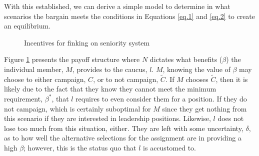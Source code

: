 \documentclass [12pt]{article}
\begin{document}
With this established, we can derive a simple model to determine in what scenarios the bargain meets the conditions in Equations \ref{eq.1} and \ref{eq.2} to create an equilibrium.

\begin{figure}
\begin{center}


\caption{Incentives for finking on seniority system}	 
\label{Fig1}
\end{center}
\end{figure}

Figure \ref{Fig1} presents the payoff structure where $N$ dictates what benefits ($\beta$) the individual member, $M$, provides to the caucus, $l$. $M$, knowing the value of $\beta$ may choose to either campaign, $C$, or to not campaign, $\tilde C$. If $M$ chooses $\tilde C$, then it is likely due to the fact that they know they cannot meet the minimum requirement, $\beta^*$, that $l$ requires to even consider them for a position. If they do not campaign, which is certainly suboptimal for $M$ since they get nothing from this scenario if they are interested in leadership positions. Likewise, $l$ does not lose too much from this situation, either. They are left with some uncertainty, $\delta$, as to how well the alternative selections for the assignment are in providing a high $\beta$; however, this is the status quo that $l$ is accustomed to. 
\end{document}
